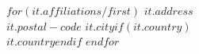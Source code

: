 $for(it.affiliations/first)$
  $it.address$\\
  $it.postal-code$ $it.city$$if(it.country)$\\$it.country$$endif$
$endfor$

